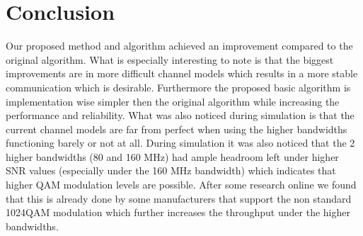 \documentclass[a4paper]{article}
\begin{document}
\section{Conclusion}
Our proposed method and algorithm achieved an improvement compared to the original algorithm. What is especially interesting to note is that the biggest improvements are in more difficult channel models which results in a more stable communication which is desirable. Furthermore the proposed basic algorithm is implementation wise simpler then the original algorithm while increasing the performance and reliability. What was also noticed during simulation is that the current channel models are far from perfect when using the higher bandwidths functioning barely or not at all. During simulation it was also noticed that the 2 higher bandwidths (80 and 160 MHz) had ample headroom left under higher SNR values (especially under the 160 MHz bandwidth) which indicates that higher QAM modulation levels are possible. After some research online we found that this is already done by some manufacturers that support the non standard 1024QAM modulation which further increases the throughput under the higher bandwidths.
\end{document}
